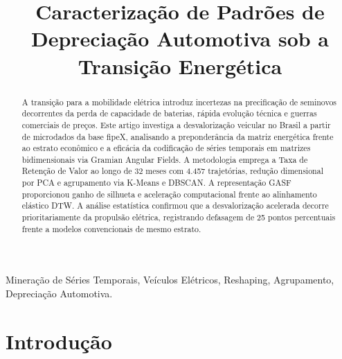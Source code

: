 \documentclass[conference]{IEEEtran}
\begin{document}
\title{Caracterização de Padrões de Depreciação Automotiva sob a Transição Energética}

\author{
}

\maketitle

\begin{abstract}
A transição para a mobilidade elétrica introduz incertezas na precificação de seminovos decorrentes da perda de capacidade de baterias, rápida evolução técnica e guerras comerciais de preços. Este artigo investiga a desvalorização veicular no Brasil a partir de microdados da base fipeX, analisando a preponderância da matriz energética frente ao estrato econômico e a eficácia da codificação de séries temporais em matrizes bidimensionais via Gramian Angular Fields. A metodologia emprega a Taxa de Retenção de Valor ao longo de 32 meses com 4.457 trajetórias, redução dimensional por PCA e agrupamento via K-Means e DBSCAN. A representação GASF proporcionou ganho de silhueta e aceleração computacional frente ao alinhamento elástico DTW. A análise estatística confirmou que a desvalorização acelerada decorre prioritariamente da propulsão elétrica, registrando defasagem de 25 pontos percentuais frente a modelos convencionais de mesmo estrato.
\end{abstract}

\begin{IEEEkeywords}
Mineração de Séries Temporais, Veículos Elétricos, Reshaping, Agrupamento, Depreciação Automotiva.
\end{IEEEkeywords}

\section{Introdução}
\end{document}
